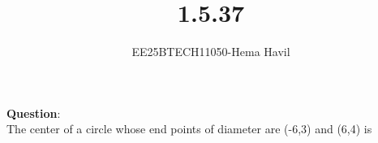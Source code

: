 \documentclass[journal]{IEEEtran}
\begin{document}

	\vspace{3cm}
	
	\title{1.5.37}
	\author{EE25BTECH11050-Hema Havil}
	\maketitle
	{\let\newpage\relax\maketitle}
	
	\renewcommand{\thefigure}{\theenumi}
	\renewcommand{\thetable}{\theenumi}
	\setlength{\intextsep}{12pt} %
	
	\renewcommand{\thetable}{\theenumi}
	
	\textbf{Question}:\\
    
         The center of a circle whose end points of diameter are (-6,3) and (6,4) is \underline{\hspace{2cm}}\\
         
\end{document}
